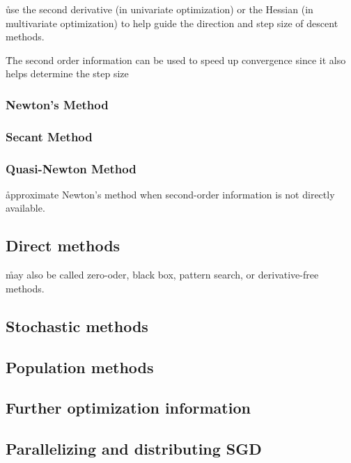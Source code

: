 \r{use the second derivative (in univariate optimization) or the Hessian (in multivariate optimization) to help guide the direction and step size of descent methods.}

\r{The second order information can be used to speed up convergence since it also helps determine the step size}

\subsubsection{Newton's Method}

\subsubsection{Secant Method}

\subsubsection{Quasi-Newton Method}

\r{approximate Newton's method when second-order information is not directly available.}

\subsection{Direct methods}

\r{may also be called zero-oder, black box, pattern search, or derivative-free methods.}

\subsection{Stochastic methods}

\subsection{Population methods}

\subsection{Further optimization information}


\subsection{Parallelizing and distributing SGD}


